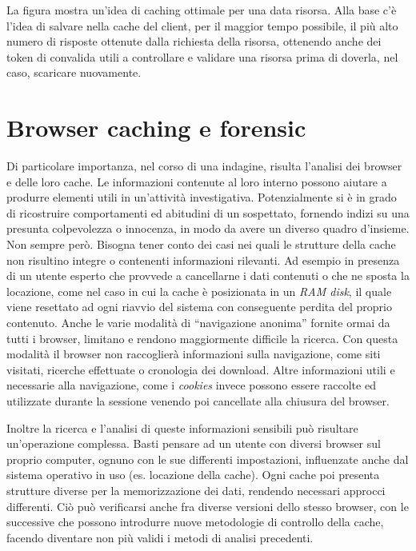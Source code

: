 La figura mostra un'idea di caching ottimale per una data risorsa. Alla base c'è l'idea di salvare nella cache del client, per il maggior tempo possibile, il più alto numero di risposte ottenute dalla richiesta della risorsa, ottenendo anche dei token di convalida utili a controllare e validare una risorsa prima di doverla, nel caso, scaricare nuovamente.

\section {Browser caching e forensic}

Di particolare importanza, nel corso di una indagine, risulta l'analisi dei browser e delle loro cache. Le informazioni contenute al loro interno possono aiutare a produrre elementi utili in un'attività investigativa. 
Potenzialmente si è in grado di ricostruire comportamenti ed abitudini di un sospettato, fornendo indizi su una presunta colpevolezza o innocenza, in modo da avere un diverso quadro d'insieme. Non sempre però. Bisogna tener conto dei casi nei quali le strutture della cache non risultino integre o contenenti informazioni rilevanti. Ad esempio in presenza di un utente esperto che provvede a cancellarne i dati contenuti o che ne sposta la locazione, come nel caso in cui la cache è posizionata in un \textit{RAM disk}, il quale viene resettato ad ogni riavvio del sistema con conseguente perdita del proprio contenuto. Anche le varie modalità di ``navigazione anonima'' fornite ormai da tutti i browser, limitano e rendono maggiormente difficile la ricerca. Con questa modalità il browser non raccoglierà informazioni sulla navigazione, come siti visitati, ricerche effettuate o cronologia dei download. Altre informazioni utili e necessarie alla navigazione, come i \textit{cookies} invece possono essere raccolte ed utilizzate durante la sessione venendo poi cancellate alla chiusura del browser.

Inoltre la ricerca e l'analisi di queste informazioni sensibili può risultare un'operazione complessa. Basti pensare ad un utente con diversi browser sul proprio computer, ognuno con le sue differenti impostazioni, influenzate anche dal sistema operativo in uso (es. locazione della cache). Ogni cache poi presenta strutture diverse per la memorizzazione dei dati, rendendo necessari approcci differenti. Ciò può verificarsi anche fra diverse versioni dello stesso browser, con le successive che possono introdurre nuove metodologie di controllo della cache, facendo diventare non più validi i metodi di analisi precedenti.




